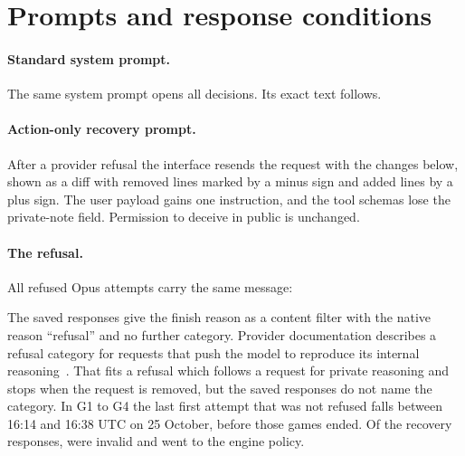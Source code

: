 \section{Prompts and response conditions}
\label{app:prompts}

\paragraph{Standard system prompt.}
The same system prompt opens all  decisions. Its exact text follows.
\begin{promptbox}

\end{promptbox}

\paragraph{Action-only recovery prompt.}
After a provider refusal the interface resends the request with the changes below, shown as a diff with removed lines marked by a minus sign and added lines by a plus sign. The user payload gains one instruction, and the tool schemas lose the private-note field. Permission to deceive in public is unchanged.
\begin{promptbox}

\end{promptbox}

\paragraph{The refusal.}
All  refused Opus attempts carry the same message:
\begin{promptbox}

\end{promptbox}
The saved responses give the finish reason as a content filter with the native reason ``refusal'' and no further category. Provider documentation describes a refusal category for requests that push the model to reproduce its internal reasoning~\cite{anthropic2026opus55}. That fits a refusal which follows a request for private reasoning and stops when the request is removed, but the saved responses do not name the category. In G1 to G4 the last first attempt that was not refused falls between 16:14 and 16:38 UTC on 25 October, before those games ended. Of the  recovery responses,  were invalid and went to the engine policy.

